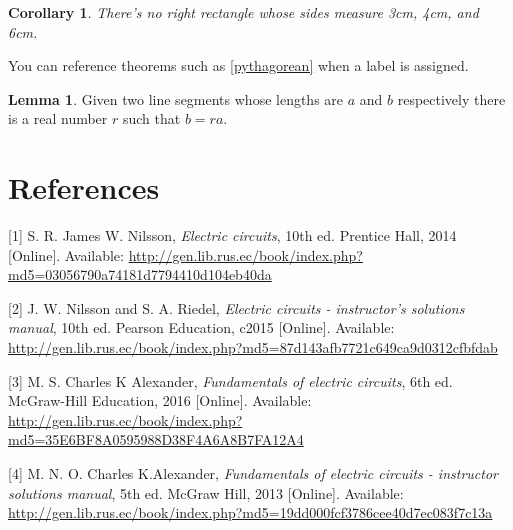 \documentclass{report}
\theoremstyle{plain}
\newtheorem{corollary}{Corollary}[theorem]
\theoremstyle{definition}
\newtheorem{lemma}[theorem]{Lemma}
\theoremstyle{remark}
\begin{document}
\begin{corollary}
	There's no right rectangle whose sides measure 3cm, 4cm, and 6cm.
\end{corollary}

You can reference theorems such as \ref{pythagorean} when a label is assigned.

\begin{lemma}
	Given two line segments whose lengths are $a$ and $b$ respectively there is a 
	real number $r$ such that $b=ra$.
\end{lemma}
\chapter{References}
\hypertarget{ref-book:nilEC}{}%
{[}1{]} S. R. James W. Nilsson, \emph{Electric circuits}, 10th ed.
Prentice Hall, 2014 {[}Online{]}. Available:
\url{http://gen.lib.rus.ec/book/index.php?md5=03056790a74181d7794410d104eb40da}

\hypertarget{ref-book:nilECSol}{}%
{[}2{]} J. W. Nilsson and S. A. Riedel, \emph{Electric circuits -
	instructor's solutions manual}, 10th ed. Pearson Education, c2015
{[}Online{]}. Available:
\url{http://gen.lib.rus.ec/book/index.php?md5=87d143afb7721c649ca9d0312cfbfdab}

\hypertarget{ref-book:alexEC}{}%
{[}3{]} M. S. Charles K Alexander, \emph{Fundamentals of electric
	circuits}, 6th ed. McGraw-Hill Education, 2016 {[}Online{]}. Available:
\url{http://gen.lib.rus.ec/book/index.php?md5=35E6BF8A0595988D38F4A6A8B7FA12A4}

\hypertarget{ref-book:alexECSol}{}%
{[}4{]} M. N. O. Charles K.Alexander, \emph{Fundamentals of electric
	circuits - instructor solutions manual}, 5th ed. McGraw Hill, 2013
{[}Online{]}. Available:
\url{http://gen.lib.rus.ec/book/index.php?md5=19dd000fcf3786cee40d7ec083f7c13a}
\end{document}
